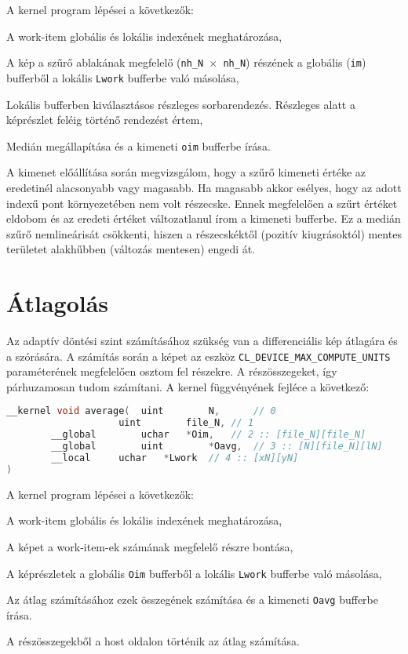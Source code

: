 \noindent A kernel program lépései a következők:
	\begin{enumerate*}
		\item A work-item globális és lokális indexének meghatározása,
		\item A kép a szűrő ablakának megfelelő (\texttt{nh\_N $\times$ nh\_N}) részének a globális (\texttt{im}) bufferből a lokális
		\texttt{Lwork} bufferbe való másolása,
		\item Lokális bufferben kiválasztásos részleges sorbarendezés. Részleges alatt a képrészlet feléig történő rendezést értem,
		\item Medián megállapítása és a kimeneti \texttt{oim} bufferbe írása.
	\end{enumerate*}

\noindent A kimenet előállítása során megvizsgálom, hogy a szűrő kimeneti értéke az eredetinél alacsonyabb vagy magasabb. Ha magasabb
	akkor esélyes, hogy az adott indexű pont környezetében nem volt részecske. Ennek megfelelően a szűrt értéket
	eldobom és az eredeti értéket változatlanul írom a kimeneti bufferbe. Ez a medián szűrő nemlineárisát csökkenti, hiszen a
	részecskéktől (pozitív kiugrásoktól) mentes területet alakhűbben (változás mentesen) engedi át.


\section{Átlagolás}
	Az adaptív döntési szint számításához szükség van a differenciális kép átlagára és a szórására.
	A számítás során a képet az eszköz \texttt{CL\_DEVICE\_MAX\_COMPUTE\_UNITS} paraméterének megfelelően osztom fel részekre. A
	részösszegeket, így párhuzamosan tudom számítani.
	\noindent A kernel függvényének fejléce a következő:
\begin{lstlisting}[language=C++]
__kernel void average(	uint		N,		// 0
					uint		file_N,	// 1					
		__global		uchar	*Oim,	// 2 :: [file_N][file_N]
		__global		uint		*Oavg,	// 3 :: [N][file_N][lN]
		__local		uchar	*Lwork	// 4 :: [xN][yN]
)
\end{lstlisting}
	
\noindent A kernel program lépései a következők:
	\begin{enumerate*}
		\item A work-item globális és lokális indexének meghatározása,
		\item A képet a work-item-ek számának megfelelő részre bontása,
		\item A képrészletek a globális \texttt{Oim} bufferből a lokális \texttt{Lwork} bufferbe való másolása,
		\item Az átlag számításához ezek összegének számítása és a kimeneti \texttt{Oavg} bufferbe írása.
	\end{enumerate*}
	A részösszegekből a host oldalon történik az átlag számítása.

